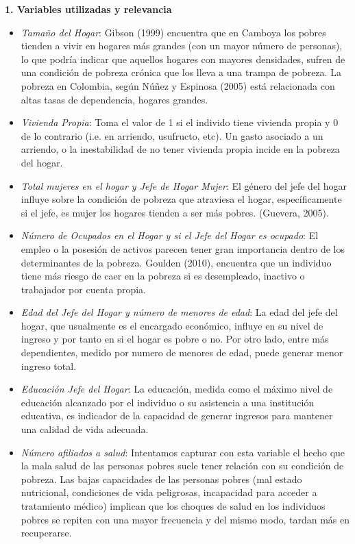\documentclass[11pt]{article}
\begin{document}
\justify
\textbf{1. Variables utilizadas y relevancia}
\begin{itemize}
\item \emph{Tamaño del Hogar}: Gibson (1999) encuentra que en Camboya los pobres tienden a vivir en hogares más grandes (con un mayor número de personas), lo que podría indicar que aquellos hogares con mayores densidades, sufren de una condición de pobreza crónica que los lleva a una trampa de pobreza. La pobreza en Colombia, según Núñez y Espinosa (2005) está relacionada con altas tasas de dependencia, hogares grandes.
\item \emph{Vivienda Propia}: Toma el valor de 1 si el individo tiene vivienda propia y 0 de lo contrario (i.e. en arriendo, usufructo, etc). Un gasto asociado a un arriendo, o la inestabilidad de no tener vivienda propia incide en la pobreza del hogar. 
\item \emph{Total mujeres en el hogar y Jefe de Hogar Mujer}: El género del jefe del hogar influye sobre la condición de pobreza que atraviesa el hogar, específicamente si el jefe, es mujer los hogares tienden a ser más pobres. (Guevera, 2005).
\item \emph{Número de Ocupados en el Hogar y si el Jefe del Hogar es ocupado}: El empleo o la posesión de activos parecen tener gran importancia dentro de los determinantes de la pobreza. Goulden (2010), encuentra que un individuo tiene más riesgo de caer en la pobreza si es desempleado, inactivo o trabajador por cuenta propia.
\item \emph{Edad del Jefe del Hogar y número de menores de edad}: La edad del jefe del hogar, que usualmente es el encargado económico, influye en su nivel de ingreso y por tanto en si el hogar es pobre o no. Por otro lado, entre más dependientes, medido por numero de menores de edad, puede generar menor ingreso total. 
\item \emph{Educación Jefe del Hogar}: La educación, medida como el máximo nivel de educación alcanzado por el individuo o su asistencia a una institución educativa,  es indicador de la capacidad de generar ingresos para mantener una calidad de vida adecuada.
\item \emph{Número afiliados a salud}: Intentamos capturar con esta variable el hecho que la mala salud de las personas pobres suele tener relación con su condición de pobreza. Las bajas capacidades de las personas pobres (mal estado nutricional, condiciones de vida peligrosas, incapacidad para acceder a tratamiento médico) implican que los choques de salud en los individuos pobres se repiten con una mayor frecuencia y del mismo modo, tardan más en recuperarse.

\end{itemize}
\end{document}
